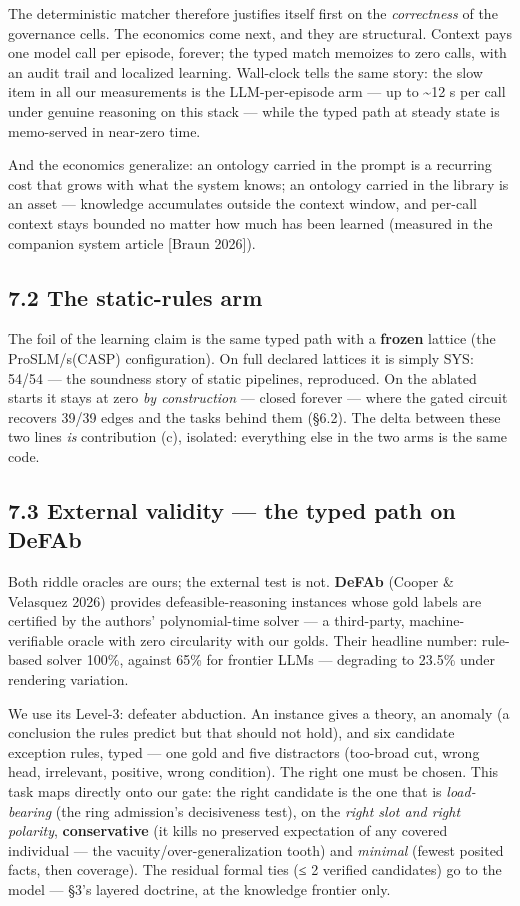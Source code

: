 \documentclass[11pt]{article}
\begin{document}
The deterministic matcher therefore justifies itself first on the \emph{correctness} of the governance cells. The economics come next, and they are structural. Context pays one model call per episode, forever; the typed match memoizes to zero calls, with an audit trail and localized learning. Wall-clock tells the same story: the slow item in all our measurements is the LLM-per-episode arm — up to \textasciitilde{}12 s per call under genuine reasoning on this stack — while the typed path at steady state is memo-served in near-zero time.

And the economics generalize: an ontology carried in the prompt is a recurring cost that grows with what the system knows; an ontology carried in the library is an asset — knowledge accumulates outside the context window, and per-call context stays bounded no matter how much has been learned (measured in the companion system article [Braun 2026]).

\subsection*{7.2 The static-rules arm}

The foil of the learning claim is the same typed path with a \textbf{frozen} lattice (the ProSLM/s(CASP) configuration). On full declared lattices it is simply SYS: 54/54 — the soundness story of static pipelines, reproduced. On the ablated starts it stays at zero \emph{by construction} — closed forever — where the gated circuit recovers 39/39 edges and the tasks behind them (§6.2). The delta between these two lines \emph{is} contribution (c), isolated: everything else in the two arms is the same code.

\subsection*{7.3 External validity — the typed path on DeFAb}

Both riddle oracles are ours; the external test is not. \textbf{DeFAb} (Cooper \& Velasquez 2026) provides defeasible-reasoning instances whose gold labels are certified by the authors' polynomial-time solver — a third-party, machine-verifiable oracle with zero circularity with our golds. Their headline number: rule-based solver 100\%, against 65\% for frontier LLMs — degrading to 23.5\% under rendering variation.

We use its Level-3: defeater abduction. An instance gives a theory, an anomaly (a conclusion the rules predict but that should not hold), and six candidate exception rules, typed — one gold and five distractors (too-broad cut, wrong head, irrelevant, positive, wrong condition). The right one must be chosen. This task maps directly onto our gate: the right candidate is the one that is \emph{load-bearing} (the ring admission's decisiveness test), on the \emph{right slot and right polarity}, \textbf{conservative} (it kills no preserved expectation of any covered individual — the vacuity/over-generalization tooth) and \emph{minimal} (fewest posited facts, then coverage). The residual formal ties (≤ 2 verified candidates) go to the model — §3's layered doctrine, at the knowledge frontier only.
\end{document}
